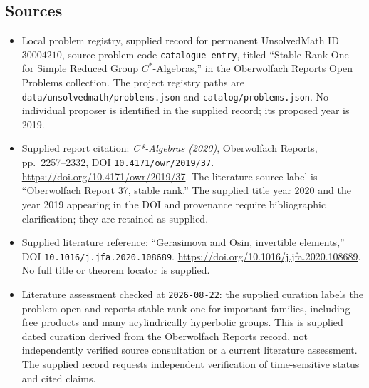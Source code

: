 \documentclass[11pt]{article}
\begin{document}
\subsection{Sources}
\begin{itemize}
\item Local problem registry, supplied record for permanent UnsolvedMath ID \(30004210\), source problem code \texttt{catalogue entry}, titled ``Stable Rank One for Simple Reduced Group \(C^*\)-Algebras,'' in the Oberwolfach Reports Open Problems collection. The project registry paths are \texttt{data/unsolvedmath/problems.json} and \texttt{catalog/problems.json}. No individual proposer is identified in the supplied record; its proposed year is 2019.
\item Supplied report citation: \emph{C*-Algebras (2020)}, Oberwolfach Reports, pp.\ 2257--2332, DOI \texttt{10.4171/owr/2019/37}. \url{https://doi.org/10.4171/owr/2019/37}. The literature-source label is ``Oberwolfach Report 37, stable rank.'' The supplied title year 2020 and the year 2019 appearing in the DOI and provenance require bibliographic clarification; they are retained as supplied.
\item Supplied literature reference: ``Gerasimova and Osin, invertible elements,'' DOI \texttt{10.1016/j.jfa.2020.108689}. \url{https://doi.org/10.1016/j.jfa.2020.108689}. No full title or theorem locator is supplied.
\item Literature assessment checked at \texttt{2026-08-22}: the supplied curation labels the problem open and reports stable rank one for important families, including free products and many acylindrically hyperbolic groups. This is supplied dated curation derived from the Oberwolfach Reports record, not independently verified source consultation or a current literature assessment. The supplied record requests independent verification of time-sensitive status and cited claims.
\end{itemize}
\end{document}
